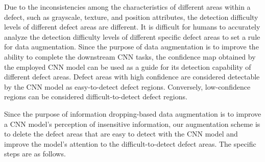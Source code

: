 \documentclass[sn-mathphys]{sn-jnl}%
\theoremstyle{thmstyleone}%
\theoremstyle{thmstyletwo}%
\theoremstyle{thmstylethree}%
\begin{document}
Due to the inconsistencies among the characteristics of different areas within a defect, such as grayscale, texture, and position attributes, the detection difficulty levels of different defect areas are different. It is difficult for humans to accurately analyze the detection difficulty levels of different specific defect areas to set a rule for data augmentation. Since the purpose of data augmentation is to improve the ability to complete the downstream CNN tasks, the confidence map obtained by the employed CNN model can be used as a guide for its detection capability of different defect areas. Defect areas with high confidence are considered detectable by the CNN model as easy-to-detect defect regions. Conversely, low-confidence regions can be considered difficult-to-detect defect regions.

Since the purpose of information dropping-based data augmentation is to improve a CNN model's perception of insensitive information, our augmentation scheme is to delete the defect areas that are easy to detect with the CNN model and improve the model's attention to the difficult-to-detect defect areas. The specific steps are as follows.
\end{document}
